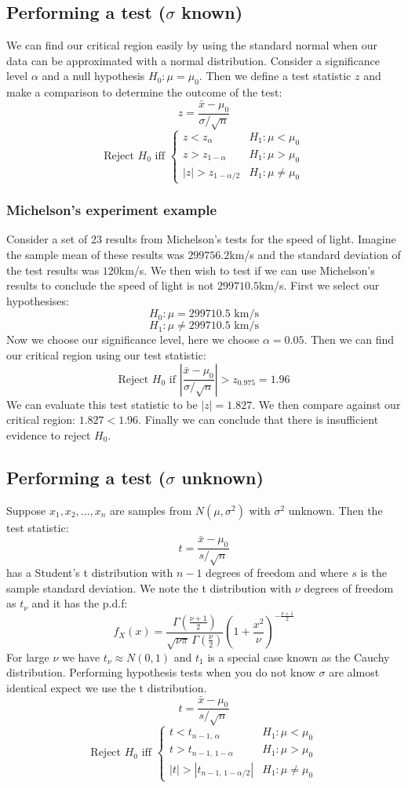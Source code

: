 \documentclass[12pt]{article}
\begin{document}
\subsection*{Performing a test (\(\sigma\) known)}
We can find our critical region easily by using the standard normal when our data can be approximated with a normal distribution. Consider a significance level \(\alpha\) and a null hypothesis \(H_0:\mu=\mu_0\). Then we define a test statistic \(z\) and make a comparison to determine the outcome of the test:
\[z=\frac{\bar{x}-\mu_0}{\sigma/\sqrt{n}}\]
\[\text{Reject }H_0\text{ iff }\begin{cases}
    z<z_\alpha & H_1:\mu<\mu_0 \\
    z > z_{1-\alpha} & H_1: \mu > \mu_0 \\
    |z| > z_{1-\alpha/2} & H_1:\mu\ne\mu_0
\end{cases}\]
\subsubsection*{Michelson's experiment example}
Consider a set of 23 results from Michelson's tests for the speed of light. Imagine the sample mean of these results was \(299756.2\)km/s and the standard deviation of the test results was \(120\)km/s. We then wish to test if we can use Michelson's results to conclude the speed of light is not \(299710.5\)km/s. First we select our hypothesises:
\[H_0:\mu=299710.5\text{ km/s}\]
\[H_1:\mu\ne 299710.5\text{ km/s}\]
Now we choose our significance level, here we choose \(\alpha=0.05\). Then we can find our critical region using our test statistic:
\[\text{Reject }H_0\text{ if }\left|\frac{\bar{x}-\mu_0}{\sigma/\sqrt{n}}\right|>z_{0.975}=1.96\]
We can evaluate this test statistic to be \(|z|=1.827\). We then compare against our critical region: \(1.827<1.96\). Finally we can conclude that there is insufficient evidence to reject \(H_0\).
\subsection*{Performing a test (\(\sigma\) unknown)}
Suppose \(x_1,x_2,...,x_n\) are samples from \(N(\mu,\sigma^2)\) with \(\sigma^2\) unknown. Then the test statistic:
\[t=\frac{\bar{x}-\mu_0}{s/\sqrt{n}}\]
has a Student's t distribution with \(n-1\) degrees of freedom and where \(s\) is the sample standard deviation. We note the t distribution with \(\nu\) degrees of freedom as \(t_\nu\) and it has the p.d.f:
\[f_X(x)=\frac{\Gamma(\frac{\nu+1}{2})}{\sqrt{\nu\pi}\,\Gamma(\frac{\nu}{2})}\left(1+\frac{x^2}{\nu}\right)^{-\frac{\nu+1}{2}}\]
For large \(\nu\) we have \(t_\nu\approx N(0,1)\) and \(t_1\) is a special case known as the Cauchy distribution. Performing hypothesis tests when you do not know \(\sigma\) are almost identical expect we use the t distribution.
\[t=\frac{\bar{x}-\mu_0}{s/\sqrt{n}}\]
\[\text{Reject }H_0\text{ iff }\begin{cases}
    t < t_{n-1,\,\alpha} & H_1:\mu<\mu_0 \\
    t > t_{n-1,\,1-\alpha} & H_1: \mu > \mu_0 \\
    |t| > |t_{n-1,\,1-\alpha/2}| & H_1:\mu\ne\mu_0
\end{cases}\]
\end{document}
